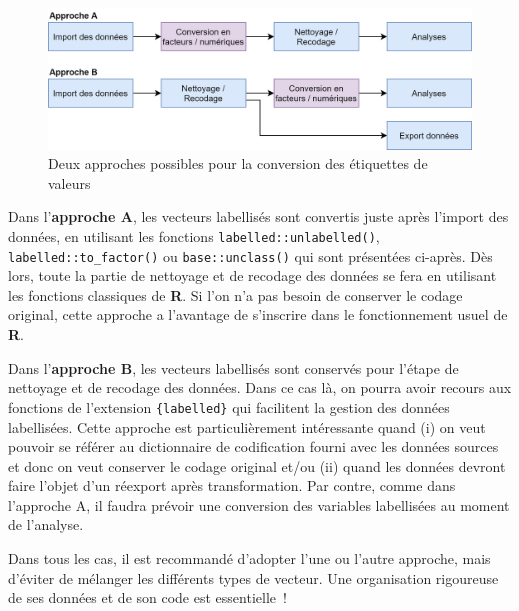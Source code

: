 \documentclass[
  letterpaper,
  DIV=11,
  numbers=noendperiod,
  oneside]{scrreprt}
\begin{document}
\begin{figure}

{\centering \includegraphics{manipulation/ressources/conversion_labelled.png}

}

\caption{\label{fig-conversion-labelled}Deux approches possibles pour la
conversion des étiquettes de valeurs}

\end{figure}

Dans l'\textbf{approche A}, les vecteurs labellisés sont convertis juste
après l'import des données, en utilisant les fonctions
\texttt{labelled::unlabelled()}, \texttt{labelled::to\_factor()} ou
\texttt{base::unclass()} qui sont présentées ci-après. Dès lors, toute
la partie de nettoyage et de recodage des données se fera en utilisant
les fonctions classiques de \textbf{R}. Si l'on n'a pas besoin de
conserver le codage original, cette approche a l'avantage de s'inscrire
dans le fonctionnement usuel de \textbf{R}.

Dans l'\textbf{approche B}, les vecteurs labellisés sont conservés pour
l'étape de nettoyage et de recodage des données. Dans ce cas là, on
pourra avoir recours aux fonctions de l'extension \texttt{\{labelled\}}
qui facilitent la gestion des données labellisées. Cette approche est
particulièrement intéressante quand (i) on veut pouvoir se référer au
dictionnaire de codification fourni avec les données sources et donc on
veut conserver le codage original et/ou (ii) quand les données devront
faire l'objet d'un réexport après transformation. Par contre, comme dans
l'approche A, il faudra prévoir une conversion des variables labellisées
au moment de l'analyse.

\begin{tcolorbox}[enhanced jigsaw, colbacktitle=quarto-callout-warning-color!10!white, opacityback=0, toprule=.15mm, colback=white, coltitle=black, bottomtitle=1mm, toptitle=1mm, titlerule=0mm, rightrule=.15mm, title=\textcolor{quarto-callout-warning-color}{\faExclamationTriangle}\hspace{0.5em}{Avertissement}, breakable, bottomrule=.15mm, opacitybacktitle=0.6, arc=.35mm, left=2mm, leftrule=.75mm, colframe=quarto-callout-warning-color-frame]

Dans tous les cas, il est recommandé d'adopter l'une ou l'autre
approche, mais d'éviter de mélanger les différents types de vecteur. Une
organisation rigoureuse de ses données et de son code est essentielle~!

\end{tcolorbox}
\end{document}
